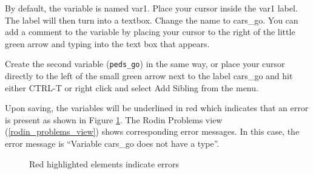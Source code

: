 By default, the variable is named \textsf{var1}. Place your cursor inside the \textsf{var1} label. The label will then turn into a textbox. Change the name to \textsf{cars\_go}. You can add a comment to the variable by placing your cursor to the right of the little green arrow and typing into the text box that appears.




Create the second variable (\texttt{peds\_go}) in the same way, or place your cursor directly to the left of the small green arrow next to the label \textsf{cars\_go} and hit either \textsf{CTRL-T} or right click and select \textsf{Add Sibling} from the menu.


Upon saving, the variables will be underlined in red which indicates that an error is present as shown in Figure \ref{fig_tut_03_error}.  The \textsf{Rodin Problems} view (\ref{rodin_problems_view}) shows corresponding error messages. In this case, the error message is ``Variable cars\_go does not have a type''.

\begin{figure}[!ht]
\begin{center}
	\caption{Red highlighted elements indicate errors}
	\label{fig_tut_03_error}
\end{center}
\end{figure}


